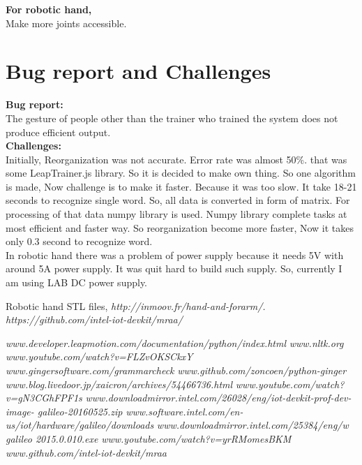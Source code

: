 \documentclass[a4paper,12pt,oneside]{book}
\begin{document}
\textbf{For robotic hand,}\\
Make more joints accessible.
\newpage
\section{Bug report and Challenges}
\textbf{Bug report:}\\
The gesture of people other than the trainer who trained the system does not produce efficient output.\\
\textbf{Challenges:}\\
Initially, Reorganization was not accurate. Error rate was almost 50\%. that was some LeapTrainer.js library. So it is decided to make own thing. So one algorithm is made, Now challenge is to make it faster. Because it was too slow. It take 18-21 seconds to recognize single word. So, all data is converted in form of matrix. For processing of that data numpy library is used. Numpy library complete tasks at most efficient and faster way. So reorganization become more faster, Now it takes only 0.3 second to recognize word.\\
In robotic hand there was a problem of power supply because it needs 5V with around 5A power supply. It was quit hard to build such supply. So, currently I am using LAB DC power supply.

\begin{thebibliography}{li}
Robotic hand STL files,
{\em http://inmoov.fr/hand-and-forarm/.}
{\em https://github.com/intel-iot-devkit/mraa/}

{\em www.developer.leapmotion.com/documentation/python/index.html}
{\em www.nltk.org}
{\em www.youtube.com/watch?v=FLZvOKSCkxY}
{\em www.gingersoftware.com/grammarcheck}
{\em www.github.com/zoncoen/python-ginger}
{\em www.blog.livedoor.jp/xaicron/archives/54466736.html}
{\em www.youtube.com/watch?v=gN3CGhFPF1s}
{\em www.downloadmirror.intel.com/26028/eng/iot-devkit-prof-dev-image-
galileo-20160525.zip}
{\em www.software.intel.com/en-us/iot/hardware/galileo/downloads}
{\em www.downloadmirror.intel.com/25384/eng/w galileo 2015.0.010.exe}
{\em www.youtube.com/watch?v=yrRMomesBKM}
{\em www.github.com/intel-iot-devkit/mraa}
\end{thebibliography}
\end{document}
